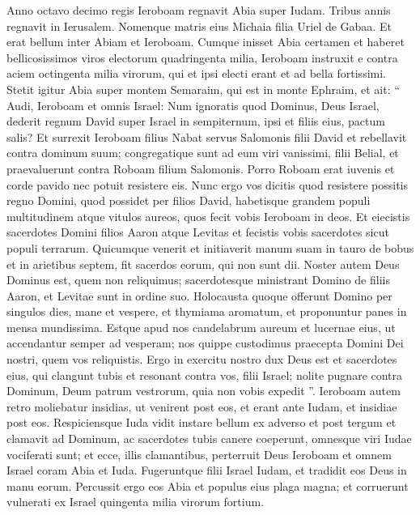 \begin{biblechapter}
\begin{biblechapter}
\begin{biblechapter}
\begin{biblechapter}
\begin{biblechapter}
\begin{biblechapter}
\begin{biblechapter}
\begin{biblechapter}
\begin{biblechapter}
\begin{biblechapter}
\begin{biblechapter}
\begin{biblechapter}
\begin{biblechapter}
\verse Anno octavo decimo regis Ieroboam regnavit Abia super Iudam. 
\verse Tribus annis regnavit in Ierusalem. Nomenque matris eius Michaia filia Uriel de Gabaa.
 Et erat bellum inter Abiam et Ieroboam. 
\verse Cumque inisset Abia certamen et haberet bellicosissimos viros electorum quadringenta milia, Ieroboam instruxit e contra aciem octingenta milia virorum, qui et ipsi electi erant et ad bella fortissimi.
 \verse Stetit igitur Abia super montem Semaraim, qui est in monte Ephraim, et ait: “ Audi, Ieroboam et omnis Israel: 
\verse Num ignoratis quod Dominus, Deus Israel, dederit regnum David super Israel in sempiternum, ipsi et filiis eius, pactum salis? 
\verse Et surrexit Ieroboam filius Nabat servus Salomonis filii David et rebellavit contra dominum suum; 
\verse congregatique sunt ad eum viri vanissimi, filii Belial, et praevaluerunt contra Roboam filium Salomonis. Porro Roboam erat iuvenis et corde pavido nec potuit resistere eis. 
\verse Nunc ergo vos dicitis quod resistere possitis regno Domini, quod possidet per filios David, habetisque grandem populi multitudinem atque vitulos aureos, quos fecit vobis Ieroboam in deos. 
\verse Et eiecistis sacerdotes Domini filios Aaron atque Levitas et fecistis vobis sacerdotes sicut populi terrarum. Quicumque venerit et initiaverit manum suam in tauro de bobus et in arietibus septem, fit sacerdos eorum, qui non sunt dii. 
\verse Noster autem Deus Dominus est, quem non reliquimus; sacerdotesque ministrant Domino de filiis Aaron, et Levitae sunt in ordine suo. 
\verse Holocausta quoque offerunt Domino per singulos dies, mane et vespere, et thymiama aromatum, et proponuntur panes in mensa mundissima. Estque apud nos candelabrum aureum et lucernae eius, ut accendantur semper ad vesperam; nos quippe custodimus praecepta Domini Dei nostri, quem vos reliquistis. 
\verse Ergo in exercitu nostro dux Deus est et sacerdotes eius, qui clangunt tubis et resonant contra vos, filii Israel; nolite pugnare contra Dominum, Deum patrum vestrorum, quia non vobis expedit ”.
 \verse Ieroboam autem retro moliebatur insidias, ut venirent post eos, et erant ante Iudam, et insidiae post eos. 
\verse Respiciensque Iuda vidit instare bellum ex adverso et post tergum et clamavit ad Dominum, ac sacerdotes tubis canere coeperunt, 
\verse omnesque viri Iudae vociferati sunt; et ecce, illis clamantibus, perterruit Deus Ieroboam et omnem Israel coram Abia et Iuda. 
\verse Fugeruntque filii Israel Iudam, et tradidit eos Deus in manu eorum. 
\verse Percussit ergo eos Abia et populus eius plaga magna; et corruerunt vulnerati ex Israel quingenta milia virorum fortium. 

\end{biblechapter}
\end{biblechapter}
\end{biblechapter}
\end{biblechapter}
\end{biblechapter}
\end{biblechapter}
\end{biblechapter}
\end{biblechapter}
\end{biblechapter}
\end{biblechapter}
\end{biblechapter}
\end{biblechapter}
\end{biblechapter}
